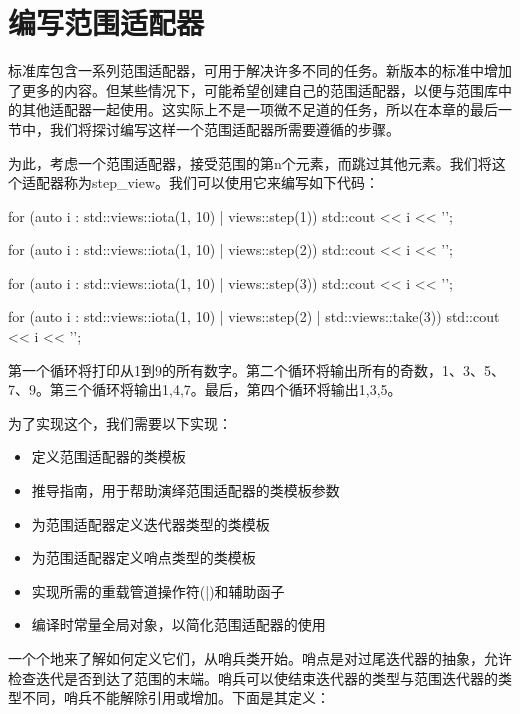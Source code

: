\section{编写范围适配器}
标准库包含一系列范围适配器，可用于解决许多不同的任务。新版本的标准中增加了更多的内容。但某些情况下，可能希望创建自己的范围适配器，以便与范围库中的其他适配器一起使用。这实际上不是一项微不足道的任务，所以在本章的最后一节中，我们将探讨编写这样一个范围适配器所需要遵循的步骤。

为此，考虑一个范围适配器，接受范围的第n个元素，而跳过其他元素。我们将这个适配器称为step\_view。我们可以使用它来编写如下代码：

\begin{cpp}
for (auto i : std::views::iota(1, 10) | views::step(1))
	std::cout << i << '\n';

for (auto i : std::views::iota(1, 10) | views::step(2))
	std::cout << i << '\n';

for (auto i : std::views::iota(1, 10) | views::step(3))
	std::cout << i << '\n';

for (auto i : std::views::iota(1, 10) | views::step(2) | 	
				std::views::take(3))
	std::cout << i << '\n';
\end{cpp}

第一个循环将打印从1到9的所有数字。第二个循环将输出所有的奇数，1、3、5、7、9。第三个循环将输出1,4,7。最后，第四个循环将输出1,3,5。

为了实现这个，我们需要以下实现：

\begin{itemize}
\item
定义范围适配器的类模板

\item
推导指南，用于帮助演绎范围适配器的类模板参数

\item
为范围适配器定义迭代器类型的类模板

\item
为范围适配器定义哨点类型的类模板

\item
实现所需的重载管道操作符(|)和辅助函子

\item
编译时常量全局对象，以简化范围适配器的使用
\end{itemize}

一个个地来了解如何定义它们，从哨兵类开始。哨点是对过尾迭代器的抽象，允许检查迭代是否到达了范围的末端。哨兵可以使结束迭代器的类型与范围迭代器的类型不同，哨兵不能解除引用或增加。下面是其定义：

